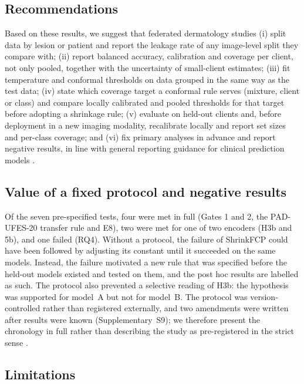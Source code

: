 \documentclass[VANCOUVER,Times1COL]{WileyNJDv5}
\begin{document}
\subsection{Recommendations}

Based on these results, we suggest that federated dermatology studies (i) split data by lesion or patient
and report the leakage rate of any image-level split they compare with; (ii) report balanced accuracy,
calibration and coverage per client, not only pooled, together with the uncertainty of small-client
estimates; (iii) fit temperature and conformal thresholds on data grouped in the same way as the test data;
(iv) state which coverage target a conformal rule serves (mixture, client or class) and compare locally
calibrated and pooled thresholds for that target before adopting a shrinkage rule; (v) evaluate on held-out
clients and, before deployment in a new imaging modality, recalibrate locally and report set sizes and
per-class coverage; and (vi) fix primary analyses in advance and report negative results, in line with
general reporting guidance for clinical prediction models \cite{collins2024tripodai}.

\subsection{Value of a fixed protocol and negative results}

Of the seven pre-specified tests, four were met in full (Gates 1 and 2, the PAD-UFES-20 transfer rule and E8), two were met for one of two encoders (H3b and 5b), and one failed (RQ4). Without a protocol, the failure of ShrinkFCP could have been
followed by adjusting its constant until it succeeded on the same models. Instead, the failure motivated a
new rule that was specified before the held-out models existed and tested on them, and the post hoc results
are labelled as such. The protocol also prevented a selective reading of H3b: the hypothesis was supported
for model~A but not for model~B. The protocol was version-controlled rather than registered externally, and
two amendments were written after results were known (Supplementary~S9); we therefore present the chronology in
full rather than describing the study as pre-registered in the strict sense
\cite{nosek2018preregistration,kapoor2023leakage,varoquaux2022failures}.

\subsection{Limitations}
\end{document}
